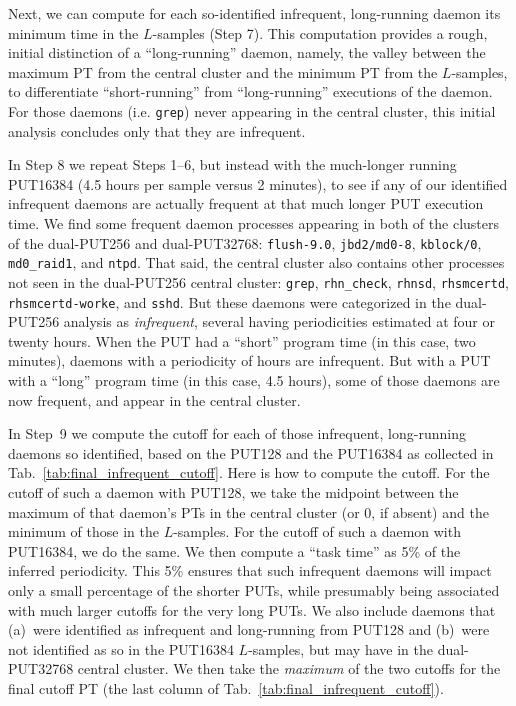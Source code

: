 \documentclass[letter]{ieice}
\begin{document}
Next, we can compute for each so-identified infrequent, long-running daemon its
minimum time in the \hbox{$L$-samples} (Step 7). 
This computation provides a rough, initial distinction of a ``long-running''
daemon, namely, the valley between the maximum PT from the central cluster 
and the minimum PT from the $L$-samples, to differentiate ``short-running'' 
from ``\hbox{long-running}'' executions of the daemon. 
For those daemons (i.e. {\tt grep}) never appearing in the central cluster,
this initial analysis concludes only that they are infrequent.

In Step 8 we repeat Steps 1--6, but instead with the much-longer running
PUT16384 (4.5 hours per \hbox{sample} versus 2 minutes), to see 
if any of our identified \hbox{infrequent} daemons are actually frequent 
at that much longer PUT execution time. 
We find some frequent daemon processes appearing in both of the 
clusters of the dual-PUT256 and dual-PUT32768: 
{\tt flush-9.0}, {\tt jbd2/md0-8}, {\tt kblock/0}, {\tt md0\_raid1}, 
and {\tt ntpd}. That said, the central cluster also contains other
  processes not seen in the dual-PUT256 central cluster: 
  {\tt grep}, {\tt rhn\_check}, {\tt rhnsd}, {\tt rhsmcertd}, 
  {\tt rhsmcertd-worke}, and {\tt sshd}. 
  But these daemons were categorized in the \hbox{dual-PUT256} analysis as {\em
  infrequent}, several having \hbox{periodicities} estimated at four or twenty hours.
When the PUT had a ``short'' 
program time (in this case, two minutes), daemons with a periodicity of
hours are \hbox{infrequent}. But with a PUT with a ``long'' program time (in this
case, 4.5 hours), some of those daemons are now frequent, and appear in the 
central cluster.

In Step~9 we compute 
the cutoff for each of those infrequent, long-running daemons so
identified, based on the PUT128 and the 
PUT16384 as collected in Tab.~\ref{tab:final_infrequent_cutoff}. 
Here is how to compute the cutoff. For the cutoff of such a daemon with PUT128, 
we take the \hbox{midpoint} between the maximum of that daemon's PTs in the 
central cluster (or 0, if absent) and the \hbox{minimum} of those in the $L$-samples. 
For the cutoff of such a daemon with PUT16384, we do the same. 
We then compute a ``task time'' as 5\% of the inferred periodicity. 
This 5\% ensures that such infrequent daemons will impact 
only a small percentage of the shorter PUTs, while presumably being 
associated with much larger cutoffs for the very long PUTs. 
We also include daemons that (a)~were identified as infrequent and 
\hbox{long-running} from PUT128 and (b)~were not identified as so in the PUT16384 
\hbox{$L$-samples}, but may have in the \hbox{dual-PUT32768} central cluster. 
We then take the {\em maximum} of the two cutoffs for the final cutoff PT 
(the last column of Tab.~\ref{tab:final_infrequent_cutoff}). 
\end{document}
